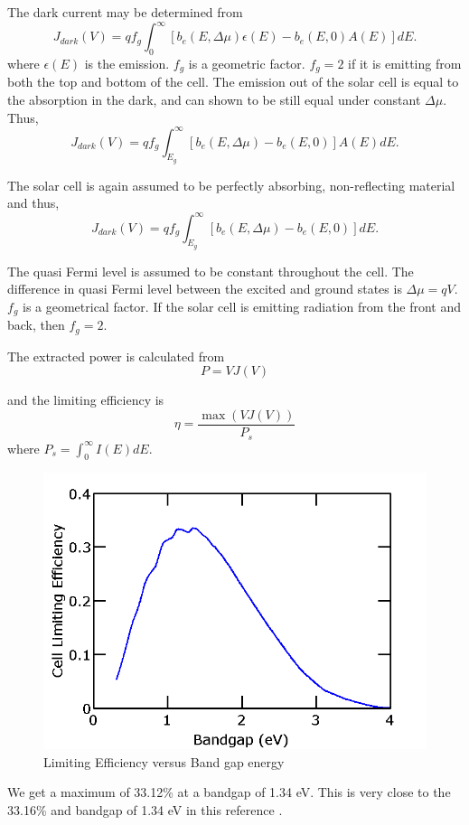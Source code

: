 \documentclass[12pt]{article}
\begin{document}
The dark current may be determined from 
\begin{equation}
J_{dark}(V) = q f_g \int_{0}^{\infty} \left [ b_e (E, \Delta \mu)  \epsilon(E) - b_e (E, 0) A(E) \right ] dE.
\end{equation}
where $\epsilon(E)$ is the emission.  
$f_g$ is a geometric factor. $f_g = 2$ if it is emitting from both the top and bottom of the cell.  
The emission out of the solar cell is equal to the absorption in the dark, and can shown to be still equal under constant $\Delta \mu$.  
Thus, 
\begin{equation}
\boxed{J_{dark}(V) = q f_g \int_{E_g}^{\infty} \left [  b_e (E, \Delta \mu) - b_e (E, 0) \right ] A(E) dE.}
\end{equation}

The solar cell is again assumed to be perfectly absorbing, non-reflecting material and thus,  
\begin{equation}
J_{dark}(V) = q f_g \int_{E_g}^{\infty} \left [ b_e (E, \Delta \mu) - b_e (E, 0) \right ] dE.
\end{equation}

The quasi Fermi level is assumed to be constant throughout the cell.  The difference in quasi Fermi level between the excited and ground states is $\Delta \mu = q V$.
$f_g$ is a geometrical factor.  If the solar cell is emitting radiation from the front and back, then $f_g = 2$.  

The extracted power is calculated from 
\begin{equation}
P = V J(V)
\end{equation}

and the limiting efficiency is 
\begin{equation}
\eta = \frac{\max(V J(V))}{P_s}
\end{equation}
where $P_s = \int_0^{\infty} I(E) dE$.  

\begin{figure}[H]
\centering
 \includegraphics[scale=.4]{Figures/LimitingEfficiencyVersusEnergy2}
 \caption{Limiting Efficiency versus Band gap energy}
  \label{fig:LimitingEfficiency}
\end{figure}
We get a maximum of 33.12\% at a bandgap of 1.34 eV.  
This is very close to the 33.16\% and bandgap of 1.34 eV in this reference \cite{Ruhle:16}.
\end{document}
